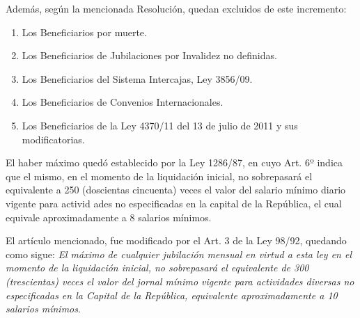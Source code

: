 Además, según la mencionada Resolución, quedan excluidos de este
incremento:

\begin{enumerate}[label=\alph*.]

\item Los Beneficiarios por muerte.

\item Los Beneficiarios de Jubilaciones por Invalidez no definidas.

\item Los Beneficiarios del Sistema Intercajas, Ley 3856/09.

\item Los Beneficiarios de Convenios Internacionales.

\item Los Beneficiarios de la Ley 4370/11 del 13 de julio de 2011 y sus modificatorias.

\end{enumerate}

El haber máximo quedó establecido por la Ley 1286/87, en cuyo Art. 6º
indica que el mismo, en el momento de la liquidación inicial, no
sobrepasará el equivalente a 250 (doscientas cincuenta) veces el valor
del salario mínimo diario vigente para activid ades no especificadas en
la capital de la República, el cual equivale aproximadamente a 8
salarios mínimos.

El artículo mencionado, fue modificado por el Art. 3 de la Ley 98/92,
quedando como sigue:
\textit{El máximo de cualquier jubilación mensual en virtud a esta ley en el momento de la liquidación inicial, no sobrepasará el equivalente de 300 (trescientas)
 veces el valor del jornal mínimo vigente para actividades diversas no especificadas en la Capital de la República, equivalente aproximadamente a 10 salarios mínimos}.
